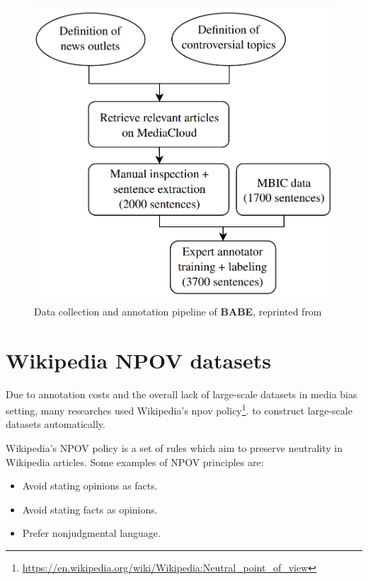 \begin{figure}
  \includegraphics[scale=0.3]{my_modules/multimedia/babe_workflow.png}
  \caption{Data collection and annotation pipeline of \textbf{BABE}, reprinted from \cite{Spinde2021f}}
  \label{fig:babe-data}
\end{figure}

\section{Wikipedia NPOV datasets}\label{wiki-npov}
Due to annotation costs and the overall lack of large-scale datasets in media bias setting, many researches \cite{pryzant2020automatically,recasens2013linguistic,hube2019neural} used Wikipedia's \Gls{npov} policy\footnote{\url{https://en.wikipedia.org/wiki/Wikipedia:Neutral_point_of_view}}. to construct large-scale datasets automatically. 

Wikipedia's NPOV policy is a set of rules which aim to preserve neutrality in Wikipedia articles. Some examples of NPOV principles are:
\begin{itemize}
    \item Avoid stating opinions as facts.
    \item Avoid stating facts as opinions.
    \item Prefer nonjudgmental language.
\end{itemize}

